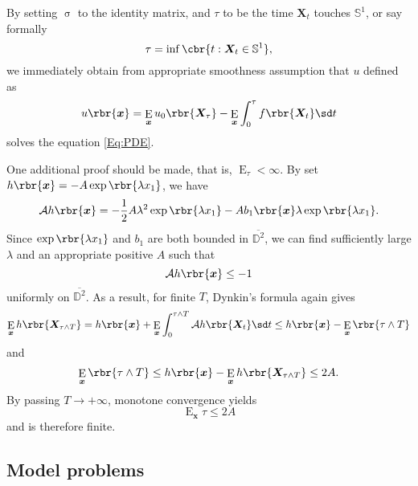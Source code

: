 \documentclass[english, nochinese]{pnote}
\DeclareMathOperator\ope{\mathrm{E}}
\begin{document}
By setting $\upsigma$ to the identity matrix, and $\tau$ to be the time $\bm{X}_t$ touches $\mathbb{S}^1$, or say formally
\begin{equation}
\tau = \inf \cbr{ t: \bm{X}_t \in \mathbb{S}^1 },
\end{equation}
we immediately obtain from appropriate smoothness assumption that $u$ defined as
\begin{equation}
u \rbr{\bm{x}} = \ope_{\bm{x}} u_0 \rbr{\bm{X}_{\tau}} - \ope_{\bm{x}} \int_0^{\tau} f \rbr{\bm{X}_t} \sd t
\end{equation}
solves the equation \eqref{Eq:PDE}.

One additional proof should be made, that is, $ \ope_{\tau} < \infty $. By set $ h \rbr{\bm{x}} = -A \exp \rbr{ \lambda x_1 } $, we have
\begin{equation}
\mathcal{A} h \rbr{\bm{x}} = -\frac{1}{2} A \lambda^2 \exp \rbr{ \lambda x_1 } - A b_1 \rbr{\bm{x}} \lambda \exp \rbr{ \lambda x_1 }.
\end{equation}
Since $ \exp \rbr{ \lambda x_1 } $ and $b_1$ are both bounded in $\overline{\mathbb{D}^2}$, we can find sufficiently large $\lambda$ and an appropriate positive $A$ such that
\begin{equation}
\mathcal{A} h \rbr{\bm{x}} \le -1
\end{equation}
uniformly on $\overline{\mathbb{D}^2}$. As a result, for finite $T$, Dynkin's formula again gives
\begin{equation}
\ope_{\bm{x}} h \rbr{\bm{X}_{ \tau \wedge T }} = h \rbr{\bm{x}} + \ope_{\bm{x}} \int_0^{ \tau \wedge T } \mathcal{A} h \rbr{\bm{X}_t} \sd t \le h \rbr{\bm{x}} - \ope_{\bm{x}} \rbr{ \tau \wedge T }
\end{equation}
and
\begin{equation}
\ope_{\bm{x}} \rbr{ \tau \wedge T } \le h \rbr{\bm{x}} - \ope_{\bm{x}} h \rbr{\bm{X}_{ \tau \wedge T }} \le 2 A.
\end{equation}
By passing $ T \rightarrow +\infty $, monotone convergence yields
\begin{equation}
\ope_{\bm{x}} \tau \le 2 A
\end{equation}
and is therefore finite.

\subsection{Model problems}
\end{document}
